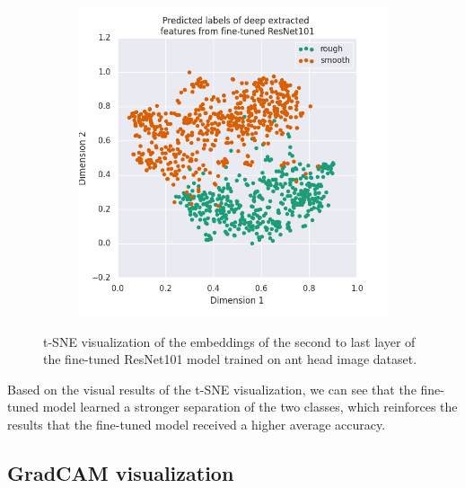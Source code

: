\documentclass{aci}
\numberwithin{equation}{section}
\begin{document}
\begin{figure}[h]
\begin{subfigure}{.45\textwidth}
        \includegraphics[width=1\linewidth]{thesis_assets/plots/fresnet101_pred_tsne.png}
    \end{subfigure}
    \caption{t-SNE visualization of the embeddings of the second to last layer
        of the fine-tuned ResNet101 model trained on ant head image dataset.}
    \label{fig:fresnet101_tsne}
\end{figure}

Based on the visual results of the t-SNE visualization, we can see that the
fine-tuned model learned a stronger separation of the two classes, which
reinforces the results that the fine-tuned model received a higher average
accuracy.

\subsection{GradCAM visualization}
\end{document}
